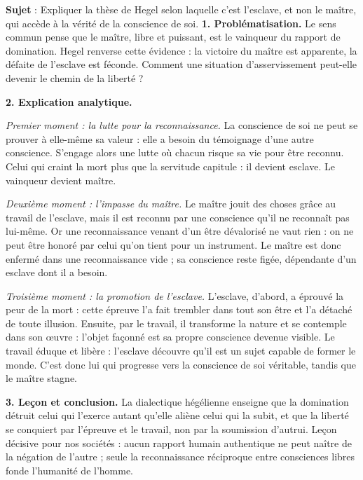 \documentclass[11pt]{article}
\begin{document}
\begin{exoresolu}
\textbf{Sujet} : Expliquer la thèse de Hegel selon laquelle c'est l'esclave, et non le maître, qui accède à la vérité de la conscience de soi.
\tcblower
\textbf{1. Problématisation.} Le sens commun pense que le maître, libre et puissant, est le vainqueur du rapport de domination. Hegel renverse cette évidence : la victoire du maître est apparente, la défaite de l'esclave est féconde. Comment une situation d'asservissement peut-elle devenir le chemin de la liberté ?

\textbf{2. Explication analytique.}

\emph{Premier moment : la lutte pour la reconnaissance.} La conscience de soi ne peut se prouver à elle-même sa valeur : elle a besoin du témoignage d'une autre conscience. S'engage alors une lutte où chacun risque sa vie pour être reconnu. Celui qui craint la mort plus que la servitude capitule : il devient esclave. Le vainqueur devient maître.

\emph{Deuxième moment : l'impasse du maître.} Le maître jouit des choses grâce au travail de l'esclave, mais il est reconnu par une conscience qu'il ne reconnaît pas lui-même. Or une reconnaissance venant d'un être dévalorisé ne vaut rien : on ne peut être honoré par celui qu'on tient pour un instrument. Le maître est donc enfermé dans une reconnaissance vide ; sa conscience reste figée, dépendante d'un esclave dont il a besoin.

\emph{Troisième moment : la promotion de l'esclave.} L'esclave, d'abord, a éprouvé la peur de la mort : cette épreuve l'a fait trembler dans tout son être et l'a détaché de toute illusion. Ensuite, par le travail, il transforme la nature et se contemple dans son œuvre : l'objet façonné est sa propre conscience devenue visible. Le travail éduque et libère : l'esclave découvre qu'il est un sujet capable de former le monde. C'est donc lui qui progresse vers la conscience de soi véritable, tandis que le maître stagne.

\textbf{3. Leçon et conclusion.} La dialectique hégélienne enseigne que la domination détruit celui qui l'exerce autant qu'elle aliène celui qui la subit, et que la liberté se conquiert par l'épreuve et le travail, non par la soumission d'autrui. Leçon décisive pour nos sociétés : aucun rapport humain authentique ne peut naître de la négation de l'autre ; seule la reconnaissance réciproque entre consciences libres fonde l'humanité de l'homme.
\end{exoresolu}
\end{document}
